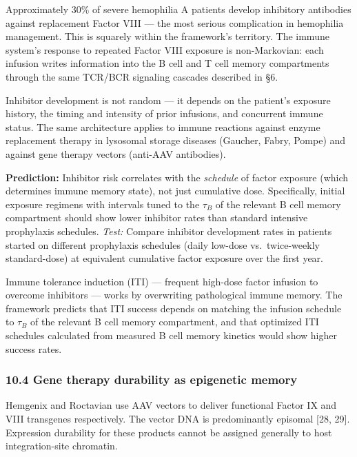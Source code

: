 \documentclass[
]{article}
\begin{document}
Approximately 30\% of severe hemophilia A patients develop inhibitory
antibodies against replacement Factor VIII --- the most serious
complication in hemophilia management. This is squarely within the
framework's territory. The immune system's response to repeated Factor
VIII exposure is non-Markovian: each infusion writes information into
the B cell and T cell memory compartments through the same TCR/BCR
signaling cascades described in §6.

Inhibitor development is not random --- it depends on the patient's
exposure history, the timing and intensity of prior infusions, and
concurrent immune status. The same architecture applies to immune
reactions against enzyme replacement therapy in lysosomal storage
diseases (Gaucher, Fabry, Pompe) and against gene therapy vectors
(anti-AAV antibodies).

\textbf{Prediction:} Inhibitor risk correlates with the \emph{schedule}
of factor exposure (which determines immune memory state), not just
cumulative dose. Specifically, initial exposure regimens with intervals
tuned to the \(\tau_B\) of the relevant B cell memory compartment should
show lower inhibitor rates than standard intensive prophylaxis
schedules. \emph{Test:} Compare inhibitor development rates in patients
started on different prophylaxis schedules (daily low-dose
vs.~twice-weekly standard-dose) at equivalent cumulative factor exposure
over the first year.

Immune tolerance induction (ITI) --- frequent high-dose factor infusion
to overcome inhibitors --- works by overwriting pathological immune
memory. The framework predicts that ITI success depends on matching the
infusion schedule to \(\tau_B\) of the relevant B cell memory
compartment, and that optimized ITI schedules calculated from measured B
cell memory kinetics would show higher success rates.

\hypertarget{gene-therapy-durability-as-epigenetic-memory}{%
\subsubsection{10.4 Gene therapy durability as epigenetic
memory}\label{gene-therapy-durability-as-epigenetic-memory}}

Hemgenix and Roctavian use AAV vectors to deliver functional Factor IX
and VIII transgenes respectively. The vector DNA is predominantly
episomal {[}28, 29{]}. Expression durability for these products cannot
be assigned generally to host integration-site chromatin.
\end{document}
